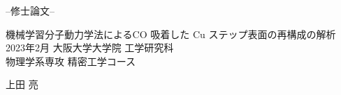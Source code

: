 \documentclass[main]{subfiles}
\begin{document}
\begin{titlepage}
    \centering
    {\Huge --修士論文--}
    \vspace{20mm}

    {\Huge 機械学習分子動力学法によるCO 吸着した Cu ステップ表面の再構成の解析}
    \vspace{100mm}
    {\Large
        2023年2月
    }
    \vspace{5mm}
    {\Large
        大阪大学大学院 工学研究科 \\
        物理学系専攻 精密工学コース
    }
    \vspace{5mm}

    {\Large 上田 亮}

\end{titlepage}
\end{document}
